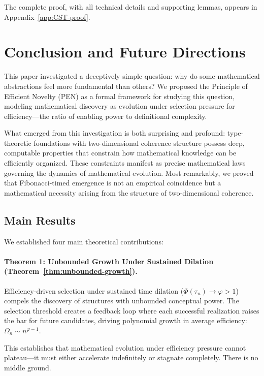 \documentclass[11pt]{article}
\theoremstyle{definition}
\theoremstyle{remark}
\begin{document}
The complete proof, with all technical details and supporting lemmas, appears in Appendix~\ref{app:CST-proof}.

\section{Conclusion and Future Directions}
\label{sec:future}

This paper investigated a deceptively simple question: why do some mathematical abstractions feel
more fundamental than others? We proposed the Principle of Efficient Novelty (PEN) as a formal
framework for studying this question, modeling mathematical discovery as evolution under selection
pressure for efficiency---the ratio of enabling power to definitional complexity.

What emerged from this investigation is both surprising and profound: type-theoretic foundations
with two-dimensional coherence structure possess deep, computable properties that constrain how
mathematical knowledge can be efficiently organized. These constraints manifest as precise mathematical
laws governing the dynamics of mathematical evolution. Most remarkably, we proved that Fibonacci-timed
emergence is not an empirical coincidence but a mathematical necessity arising from the structure
of two-dimensional coherence.

\subsection{Main Results}

We established four main theoretical contributions:

\paragraph{Theorem 1: Unbounded Growth Under Sustained Dilation (Theorem~\ref{thm:unbounded-growth}).}
Efficiency-driven selection under sustained time dilation ($\Phi(\tau_n) \to \varphi > 1$) compels the
discovery of structures with unbounded conceptual power. The selection threshold creates a feedback
loop where each successful realization raises the bar for future candidates, driving polynomial growth
in average efficiency: $\Omega_n \sim n^{\varphi-1}$.

This establishes that mathematical evolution under efficiency pressure cannot plateau---it must
either accelerate indefinitely or stagnate completely. There is no middle ground.
\end{document}
